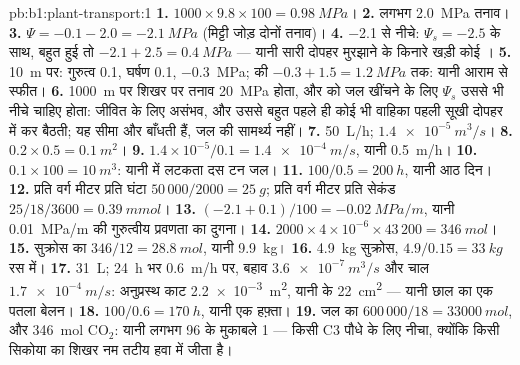 \begin{solution}{pb:b1:plant-transport:1}
\textbf{1.} $1000\times 9.8\times 100 = \qty{0.98}{MPa}$।
\textbf{2.} लगभग \qty{2.0}{MPa} तनाव।
\textbf{3.} $\Psi = -0.1 - 2.0 = \qty{-2.1}{MPa}$ (मिट्टी जोड़ दोनों
तनाव)।
\textbf{4.} \qty{-2.1}{} से नीचे: $\Psi_s = -2.5$ के साथ,  बहुत
हुई तो $-2.1 + 2.5 = \qty{0.4}{MPa}$ --- यानी सारी दोपहर मुरझाने के
किनारे खड़ी कोई ।
\textbf{5.} \qty{10}{m} पर: गुरुत्व \qty{0.1}{}, घर्षण \qty{0.1}{},
 \qty{-0.3}{MPa};  की  $-0.3 + 1.5 = \qty{1.2}{MPa}$ तक:
यानी आराम से स्फीत।
\textbf{6.} \qty{1000}{m} पर शिखर पर तनाव \qty{20}{MPa} होता,
और  को जल खींचने के लिए $\Psi_s$ उससे भी नीचे चाहिए होता: जीवित
 के लिए असंभव, और उससे बहुत पहले ही कोई भी वाहिका पहली सूखी दोपहर
में  कर बैठती; यह सीमा  और  बाँधती हैं, जल की
सामर्थ्य नहीं।
\textbf{7.} \qty{50}{L/h}; $\qty{1.4e-5}{m^3/s}$।
\textbf{8.} $0.2\times 0.5 = \qty{0.1}{m^2}$।
\textbf{9.} $1.4\times 10^{-5}/0.1 = \qty{1.4e-4}{m/s}$, यानी \qty{0.5}{m/h}।
\textbf{10.} $0.1\times 100 = \qty{10}{m^3}$: यानी  में लटकता दस टन जल।
\textbf{11.} $100/0.5 = \qty{200}{h}$, यानी आठ दिन।
\textbf{12.} प्रति वर्ग मीटर प्रति घंटा $50\,000/2000 = \qty{25}{g}$;
प्रति वर्ग मीटर प्रति सेकंड $25/18/3600 = \qty{0.39}{mmol}$।
\textbf{13.} $(-2.1 + 0.1)/100 = \qty{-0.02}{MPa/m}$, यानी
\qty{0.01}{MPa/m} की गुरुत्वीय प्रवणता का दुगना।
\textbf{14.} $2000\times 4\times 10^{-6}\times 43\,200 = \qty{346}{mol}$।
\textbf{15.} सुक्रोस का $346/12 = \qty{28.8}{mol}$, यानी \qty{9.9}{kg}।
\textbf{16.} \qty{4.9}{kg} सुक्रोस, $4.9/0.15 = \qty{33}{kg}$ रस में।
\textbf{17.} \qty{31}{L}; \qty{24}{h} भर \qty{0.6}{m/h} पर, बहाव
$\qty{3.6e-7}{m^3/s}$ और चाल $\qty{1.7e-4}{m/s}$: अनुप्रस्थ काट
\qty{2.2e-3}{m^2}, यानी  के \qty{22}{cm^2} --- यानी छाल का
एक पतला बेलन।
\textbf{18.} $100/0.6 = \qty{170}{h}$, यानी एक हफ़्ता।
\textbf{19.} जल का $600\,000/18 = \qty{33000}{mol}$, और
\qty{346}{mol} $\mathrm{CO_2}$: यानी लगभग 96 के मुकाबले 1 --- किसी C3
पौधे के लिए नीचा, क्योंकि किसी सिकोया का शिखर नम तटीय हवा में जीता है।

\end{solution}

